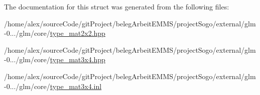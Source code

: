 The documentation for this struct was generated from the following files\-:\begin{DoxyCompactItemize}
\item 
/home/alex/source\-Code/git\-Project/beleg\-Arbeit\-E\-M\-M\-S/project\-Sogo/external/glm-\/0.../glm/core/\hyperlink{type__mat2x2_8hpp}{type\-\_\-mat2x2.\-hpp}\item 
/home/alex/source\-Code/git\-Project/beleg\-Arbeit\-E\-M\-M\-S/project\-Sogo/external/glm-\/0.../glm/core/\hyperlink{type__mat3x4_8hpp}{type\-\_\-mat3x4.\-hpp}\item 
/home/alex/source\-Code/git\-Project/beleg\-Arbeit\-E\-M\-M\-S/project\-Sogo/external/glm-\/0.../glm/core/\hyperlink{type__mat3x4_8inl}{type\-\_\-mat3x4.\-inl}\end{DoxyCompactItemize}
